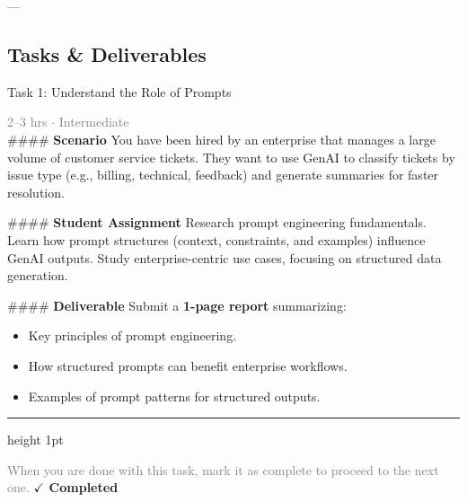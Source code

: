 \documentclass[10pt,a4paper]{article}
\begin{document}
---

\subsection*{Tasks \& Deliverables}

\begin{taskbox}{Task 1: Understand the Role of Prompts}

    {\small \textcolor{gray}{2--3 hrs $\cdot$ Intermediate}}\\[12pt]

    \#\#\#\# \textbf{Scenario}
You have been hired by an enterprise that manages a large volume of customer service tickets. They want to use GenAI to classify tickets by issue type (e.g., billing, technical, feedback) and generate summaries for faster resolution.

\#\#\#\# \textbf{Student Assignment}
Research prompt engineering fundamentals. Learn how prompt structures (context, constraints, and examples) influence GenAI outputs. Study enterprise-centric use cases, focusing on structured data generation.

\#\#\#\# \textbf{Deliverable}
Submit a \textbf{1-page report} summarizing:
\begin{itemize}
    \item Key principles of prompt engineering.
    \item How structured prompts can benefit enterprise workflows.
    \item Examples of prompt patterns for structured outputs.\par
\end{itemize}

    \vspace{16pt}

    \textcolor{cardBorder}{\hrule height 1pt}\vspace{8pt}

    \small \textcolor{gray}{When you are done with this task, mark it as complete to proceed to the next one.} \hfill \textbf{\textcolor{brandDark}{$\checkmark$ Completed}}

\end{taskbox}
\end{document}
